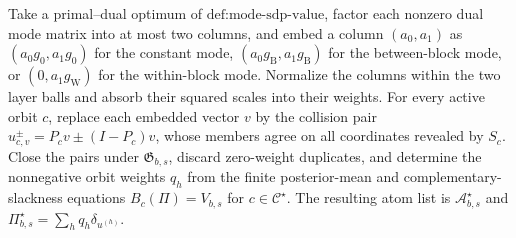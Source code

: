 Take a primal--dual optimum of \(\text{def:mode-sdp-value}\), factor each nonzero dual mode matrix into at most two columns, and embed a column \((a_0,a_1)\) as \((a_0g_0,a_1g_0)\) for the constant mode, \((a_0g_{\mathrm B},a_1g_{\mathrm B})\) for the between-block mode, or \((0,a_1g_{\mathrm W})\) for the within-block mode. Normalize the columns within the two layer balls and absorb their squared scales into their weights. For every active orbit \(c\), replace each embedded vector \(v\) by the collision pair \(u_{c,v}^{\pm}=P_cv\pm(I-P_c)v\), whose members agree on all coordinates revealed by \(S_c\). Close the pairs under \(\mathfrak G_{b,s}\), discard zero-weight duplicates, and determine the nonnegative orbit weights \(q_h\) from the finite posterior-mean and complementary-slackness equations \(B_c(\Pi)=V_{b,s}\) for \(c\in\mathcal C^{\star}\). The resulting atom list is \(\mathcal A_{b,s}^{\star}\) and \(\Pi_{b,s}^{\star}=\sum_hq_h\delta_{u^{(h)}}\).